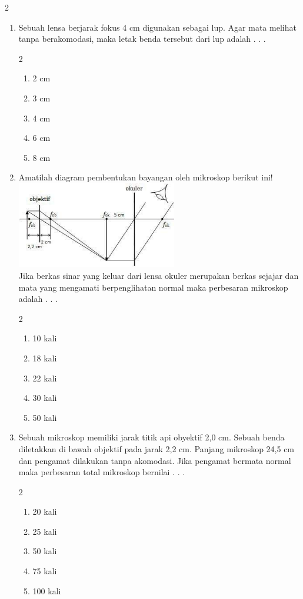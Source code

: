\documentclass[10pt,a4paper]{extarticle}
\newcommand{\pilgani}[1]{                            \vspace{-0.3cm}\begin{multicols}{2}
 \begin{enumerate}[label=\Alph*., itemsep=0pt,topsep=0pt,leftmargin=*,align=Center]#1                     \end{enumerate}
 \phantom{ini cuma sapi, wedus, dan ayam}
 \end{multicols}}
\begin{document}
\begin{multicols*}{2}
\begin{enumerate}
\item Sebuah lensa berjarak fokus 4 cm digunakan sebagai lup. Agar mata melihat tanpa berakomodasi, maka letak benda tersebut dari lup adalah . . .
\pilgani{
	\item 2 cm
	\item 3 cm
	\item 4 cm
	\item 6 cm
	\item 8 cm
}
\vspace{2cm}

\item Amatilah diagram pembentukan bayangan oleh mikroskop berikut ini!\\
\includegraphics[width=7cm]{pic/bayangan-mikroskop2}\\
Jika berkas sinar yang keluar dari lensa okuler merupakan berkas sejajar dan mata yang mengamati berpenglihatan normal maka perbesaran mikroskop adalah . . .
\pilgani{
	\item 10 kali
	\item 18 kali
	\item 22 kali
	\item 30 kali
	\item 50 kali}\vspace{3cm}


\item Sebuah mikroskop memiliki jarak titik api obyektif 2,0 cm. Sebuah benda diletakkan di bawah objektif pada jarak 2,2 cm. Panjang mikroskop 24,5 cm dan pengamat dilakukan tanpa akomodasi. Jika pengamat bermata normal maka perbesaran total mikroskop bernilai . . .
\pilgani{	
	\item 20 kali
	\item 25 kali
	\item 50 kali
	\item 75 kali
	\item 100 kali
}
\vspace{4cm}


\end{enumerate}
\end{multicols*}
\end{document}
